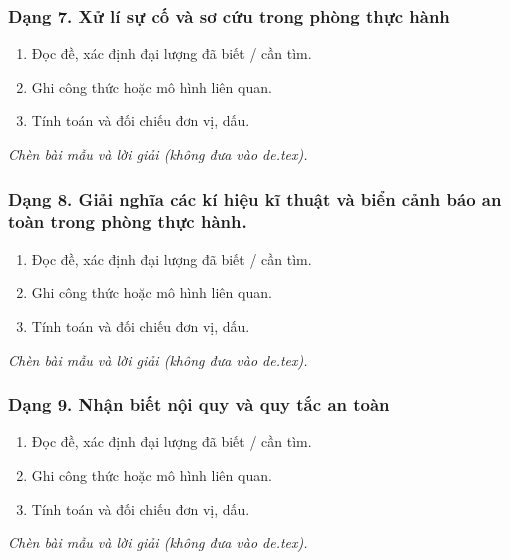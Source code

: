 \subsubsection{Dạng 7. Xử lí sự cố và sơ cứu trong phòng thực hành}
\begin{phuongphap}
\begin{enumerate}
\item Đọc đề, xác định đại lượng đã biết / cần tìm.
\item Ghi công thức hoặc mô hình liên quan.
\item Tính toán và đối chiếu đơn vị, dấu.
\end{enumerate}
\end{phuongphap}
\begin{vidumau}
\textit{Chèn bài mẫu và lời giải (không đưa vào de.tex).}
\end{vidumau}

\subsubsection{Dạng 8. Giải nghĩa các kí hiệu kĩ thuật và biển cảnh báo an toàn trong phòng thực hành.}
\begin{phuongphap}
\begin{enumerate}
\item Đọc đề, xác định đại lượng đã biết / cần tìm.
\item Ghi công thức hoặc mô hình liên quan.
\item Tính toán và đối chiếu đơn vị, dấu.
\end{enumerate}
\end{phuongphap}
\begin{vidumau}
\textit{Chèn bài mẫu và lời giải (không đưa vào de.tex).}
\end{vidumau}

\subsubsection{Dạng 9. Nhận biết nội quy và quy tắc an toàn}
\begin{phuongphap}
\begin{enumerate}
\item Đọc đề, xác định đại lượng đã biết / cần tìm.
\item Ghi công thức hoặc mô hình liên quan.
\item Tính toán và đối chiếu đơn vị, dấu.
\end{enumerate}
\end{phuongphap}
\begin{vidumau}
\textit{Chèn bài mẫu và lời giải (không đưa vào de.tex).}
\end{vidumau}

